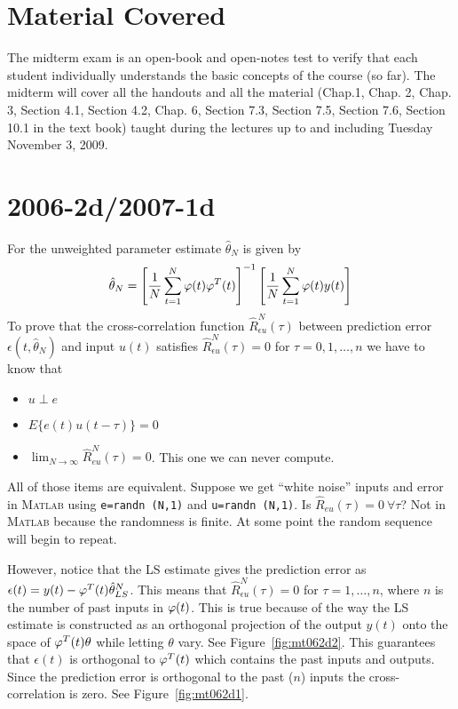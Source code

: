 \mainmatter%
\setcounter{page}{1}

\lectureseries[\course]{\course}

\date{November 5, 2009}

\setaddress%

\setcounter{lecture}{20}
\setcounter{chapter}{20}


\section{Material Covered}
The midterm exam is an open-book and open-notes test to verify that each student individually understands the basic concepts of the course (so far).
The midterm will cover all the handouts and all the material (Chap.1, Chap. 2, Chap. 3, Section 4.1, Section 4.2, Chap. 6, Section 7.3, Section 7.5, Section 7.6, Section 10.1 in the text book) taught during the lectures up to and including Tuesday November 3, 2009.

\section{2006-2d/2007-1d}%
For the unweighted parameter estimate $\hat{\theta}_N$ is given by
$$\hat{\theta}_N = {\left[\frac{1}{N}\sum_{t=1}^N\varphi(t)\varphi^T(t)\right]}^{-1}\left[\frac{1}{N}\sum_{t=1}^N\varphi(t)y(t)\right]$$
To prove that the cross-correlation function $\hat{R}_{\epsilon u}^N(\tau)$ between prediction error $\epsilon(t,\hat{\theta}_N)$ and input $u(t)$ satisfies $\hat{R}_{\epsilon u}^N(\tau)=0$ for $\tau=0,1,\ldots,n$ we have to know that
\begin{itemize}
\item $u\perp e$
\item $E\{e(t)u(t-\tau)\}=0$
\item $\lim_{N\to\infty}\hat{R}_{eu}^N(\tau)=0$.
This one we can never compute.
\end{itemize}
All of those items are equivalent.
Suppose we get ``white noise'' inputs and error in \textsc{Matlab} using \texttt{e=randn (N,1)} and \texttt{u=randn (N,1)}.
Is $\hat{R}_{eu}(\tau)=0~\forall \tau$? Not in \textsc{Matlab} because the randomness is finite.
At some point the random sequence will begin to repeat.

However, notice that the LS estimate gives the prediction error as $\epsilon(t)=y(t)-\varphi^T(t)\hat{\theta}_{LS}^N$.
This means that $\hat{R}_{\epsilon u}^N(\tau)=0$ for $\tau=1,\ldots,n$, where $n$ is the number of past inputs in $\varphi(t)$.
This is true because of the way the LS estimate is constructed as an orthogonal projection of the output $y(t)$ onto the space of $\varphi^T(t)\theta$ while letting $\theta$ vary.
See Figure~\ref{fig:mt062d2}.
This guarantees that $\epsilon(t)$ is orthogonal to $\varphi^T(t)$ which contains the past inputs and outputs.
Since the prediction error is orthogonal to the past ($n$) inputs the cross-correlation is zero.
See Figure~\ref{fig:mt062d1}.

